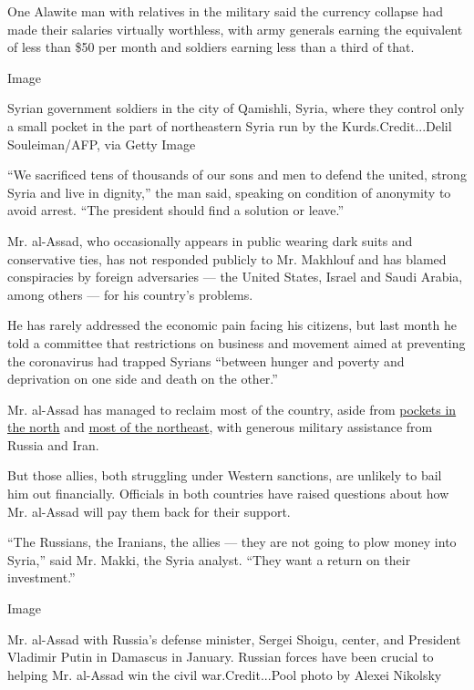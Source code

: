 One Alawite man with relatives in the military said the currency
collapse had made their salaries virtually worthless, with army generals
earning the equivalent of less than \$50 per month and soldiers earning
less than a third of that.

Image

Syrian government soldiers in the city of Qamishli, Syria, where they
control only a small pocket in the part of northeastern Syria run by the
Kurds.Credit...Delil Souleiman/AFP, via Getty Image

``We sacrificed tens of thousands of our sons and men to defend the
united, strong Syria and live in dignity,'' the man said, speaking on
condition of anonymity to avoid arrest. ``The president should find a
solution or leave.''

Mr. al-Assad, who occasionally appears in public wearing dark suits and
conservative ties, has not responded publicly to Mr. Makhlouf and has
blamed conspiracies by foreign adversaries --- the United States, Israel
and Saudi Arabia, among others --- for his country's problems.

He has rarely addressed the economic pain facing his citizens, but last
month he told a committee that restrictions on business and movement
aimed at preventing the coronavirus had trapped Syrians ``between hunger
and poverty and deprivation on one side and death on the other.''

Mr. al-Assad has managed to reclaim most of the country, aside from
\href{https://www.nytimes.com/2020/02/26/world/middleeast/syria-idlib-refugees.html}{pockets
in the north} and
\href{https://www.nytimes.com/interactive/2019/10/30/world/middleeast/syria-turkey-maps.html}{most
of the northeast}, with generous military assistance from Russia and
Iran.

But those allies, both struggling under Western sanctions, are unlikely
to bail him out financially. Officials in both countries have raised
questions about how Mr. al-Assad will pay them back for their support.

``The Russians, the Iranians, the allies --- they are not going to plow
money into Syria,'' said Mr. Makki, the Syria analyst. ``They want a
return on their investment.''

Image

Mr. al-Assad with Russia's defense minister, Sergei Shoigu, center, and
President Vladimir Putin in Damascus in January. Russian forces have
been crucial to helping Mr. al-Assad win the civil war.Credit...Pool
photo by Alexei Nikolsky

